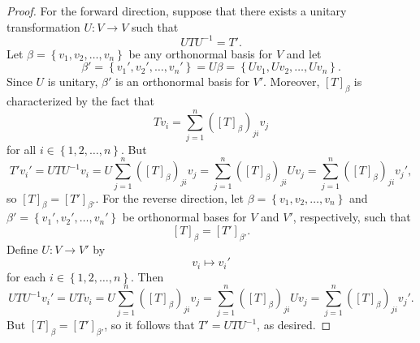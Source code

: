 \documentclass[linearalgebra]{subfiles}
\begin{document}
    \begin{proof}
        For the forward direction, suppose that there exists a unitary transformation $U:V\to V$ such that
        \begin{equation*}
            UTU^{-1} = T'.
        \end{equation*}
        Let $\beta = \left\lbrace v_1,v_2,\ldots,v_n \right\rbrace$ be any orthonormal basis for $V$ and let
        \begin{equation*}
            \beta' = \left\lbrace v_1', v_2', \ldots, v_n' \right\rbrace = U\beta = \left\lbrace Uv_1, Uv_2, \ldots, Uv_n \right\rbrace .
        \end{equation*}
        Since $U$ is unitary, $\beta'$ is an orthonormal basis for $V'$. Moreover, $\left[ T \right] _\beta$ is characterized by the fact that
        \begin{equation*}
            Tv_i = \sum^{n}_{j=1} \left( \left[ T \right] _\beta \right) _{ji}v_j
        \end{equation*}
        for all $i\in\left\lbrace 1,2,\ldots,n \right\rbrace$. But
        \begin{equation*}
            T'v_i' = UTU^{-1} v_i = U\sum^{n}_{j=1} \left( \left[ T \right] _\beta \right) _{ji}v_j = \sum^{n}_{j=1} \left( \left[ T \right] _\beta \right)_{ji}Uv_j = \sum^{n}_{j=1} \left( \left[ T \right] _\beta \right) _{ji}v_j' ,
        \end{equation*}
        so $\left[ T \right] _\beta = \left[ T' \right] _{\beta'}$. For the reverse direction, let $\beta=\left\lbrace v_1,v_2,\ldots,v_n \right\rbrace$ and $\beta' = \left\lbrace v_1',v_2',\ldots,v_n' \right\rbrace$ be orthonormal bases for $V$ and $V'$, respectively, such that
        \begin{equation*}
            \left[ T \right] _\beta = \left[ T' \right] _{\beta'}.
        \end{equation*}
        Define $U:V\to V'$ by
        \begin{equation*}
            v_i\mapsto v_i'
        \end{equation*}
        for each $i\in\left\lbrace 1,2,\ldots,n \right\rbrace$. Then
        \begin{equation*}
            UTU^{-1} v_i' = UTv_i = U\sum^{n}_{j=1} \left( \left[ T \right] _\beta \right) _{ji}v_j = \sum^{n}_{j=1} \left( \left[ T \right] _\beta \right) _{ji}Uv_j = \sum^{n}_{j=1} \left( \left[ T \right] _\beta \right) _{ji}v_j'.
        \end{equation*}
        But $\left[ T \right] _\beta = \left[ T' \right] _{\beta'}$, so it follows that $T'=UTU^{-1}$, as desired.
    \end{proof}
\end{document}
